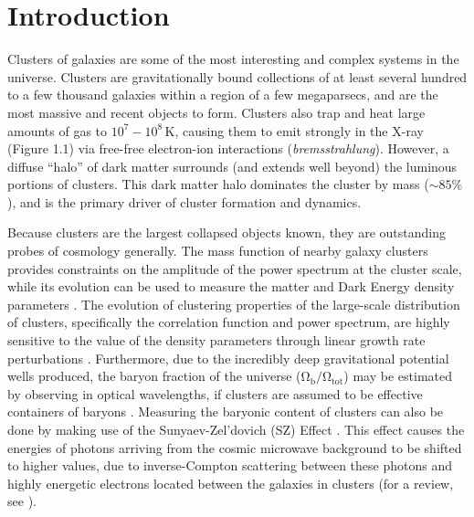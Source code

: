 \chapter{Introduction}

Clusters of galaxies are some of the most interesting and complex systems in the universe. Clusters are gravitationally bound collections of at least several hundred to a few thousand galaxies within a region of a few megaparsecs, and are the most massive and recent objects to form. Clusters also trap and heat large amounts of gas to $\mathrm{10^{7} - 10^{8}}\, \mathrm{K}$, causing them to emit strongly in the X-ray (Figure 1.1) via free-free electron-ion interactions ({\em bremsstrahlung}). However, a diffuse ``halo'' of dark matter surrounds (and extends well beyond) the luminous portions of clusters. This dark matter halo dominates the cluster by mass ($\mathrm{\sim 85\%}$), and is the primary driver of cluster formation and dynamics.

Because clusters are the largest collapsed objects known, they are outstanding probes of cosmology generally. The mass function of nearby galaxy clusters provides constraints on the amplitude of the power spectrum at the cluster scale, while its evolution can be used to measure the matter and Dark Energy density parameters \citep{RO02.1,VO05.1}. The evolution of clustering properties of the large-scale distribution of clusters, specifically the correlation function and power spectrum, are highly sensitive to the value of the density parameters through linear growth rate perturbations \citep{BO01.1,MO01.1}. Furthermore, due to the incredibly deep gravitational potential wells produced, the baryon fraction of the universe ($\mathrm{\Omega_{b}/\Omega_{tot}}$) may be estimated by observing in optical wavelengths, if clusters are assumed to be effective containers of baryons \citep{FA91.1,WH93.1}. Measuring the baryonic content of clusters can also be done by making use of the Sunyaev-Zel'dovich (SZ) Effect \citep{SU72.1}. This effect causes the energies of photons arriving from the cosmic microwave background to be shifted to higher values, due to inverse-Compton scattering between these photons and highly energetic electrons located between the galaxies in clusters (for a review, see \citealt{BI99.1}).


